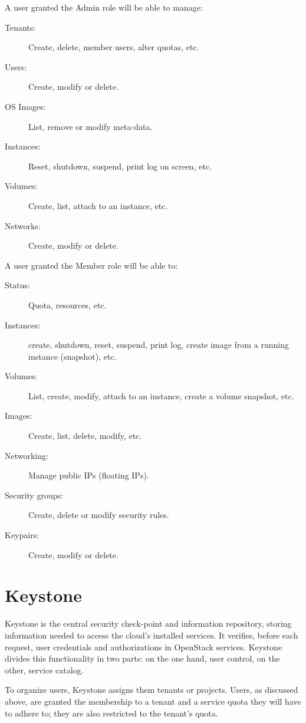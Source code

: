 A user granted the Admin role will be able to manage:

\begin{description}
 \item[Tenants:] Create, delete, member users, alter quotas, etc.
 \item[Users:] Create, modify or delete.
 \item[OS Images:] List, remove or modify meta-data.
 \item[Instances:] Reset, shutdown, suspend, print log on screen, etc.
 \item[Volumes:] Create, list, attach to an instance, etc.
 \item[Networks:] Create, modify or delete.
\end{description}

A user granted the Member role will be able to:

\begin{description}
 \item[Status:] Quota, resources, etc.
 \item[Instances:] create, shutdown, reset, suspend, print log, create image from a running instance (snapshot), etc.
 \item[Volumes:] List, create, modify, attach to an instance, create a volume snapshot, etc.
 \item[Images:] Create, list, delete, modify, etc.
 \item[Networking:] Manage public IPs (floating IPs).
 \item[Security groups:] Create, delete or modify security rules.
 \item[Keypairs:] Create, modify or delete.
\end{description}

\section{Keystone}\label{sec:keystone}
\noindent Keystone is the central security check-point and information repository, storing information needed to access the cloud's installed services. It verifies, before each request, user credentials and authorizations in OpenStack services. Keystone divides this functionality in two parts: on the one hand, user control, on the other, service catalog.

To organize users, Keystone assigns them tenants or projects. Users, as discussed above, are granted the membership to a tenant and a service quota they will have to adhere to; they are also restricted to the tenant's quota.

